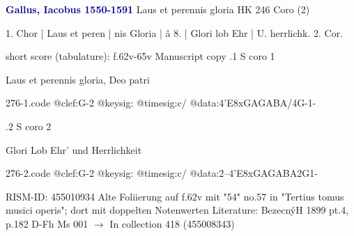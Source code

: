 \documentclass[twocolumn]{book}
\begin{document}
\newline \par \vspace{7pt} \textcolor{darkblue}{\textbf{Gallus, Iacobus  1550-1591}}
\newline Laus et perennis gloria    HK 246
\newline Coro (2)
\newline \begin{itshape}[f.62v, at left:] 1. Chor | Laus et peren | nis Gloria | â 8. | Glori lob Ehr | U. herrlichk. 2. Cor.\end{itshape} 
\newline \textcolor{darkblue}{}  short score (tabulature): f.62v-65v  
\newline Manuscript copy
.1  S coro 1
\newline \begin{footnotesize} Laus et perennis gloria, Deo patri \end{footnotesize}  
\begin{filecontents*}{276-1.code}
@clef:G-2
@keysig:
@timesig:c/
@data:4'E{8xGA}{GABA}/4G-1-
\end{filecontents*}
\newline
%

.2  S coro 2
\newline \begin{footnotesize} Glori Lob Ehr' und Herrlichkeit \end{footnotesize}  
\begin{filecontents*}{276-2.code}
@clef:G-2
@keysig:
@timesig:c/
@data:2--4'E{8xGAGA}{BA}2G1-
\end{filecontents*}
\newline
%

\newline RISM-ID: 455010934
\newline Alte Foliierung auf f.62v mit "54"
\newline no.57 in "Tertius tomus musici operis"; dort mit doppelten Notenwerten
\newline Literature: BezecnýH 1899  pt.4, p.182
\newline D-Fh  Ms 001
\newline $\rightarrow$ In collection 418 (455008343)
\end{document}
